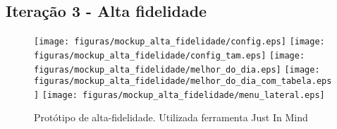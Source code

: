 	\subsection{Iteração 3 - Alta fidelidade}

		\begin{figure}[h]
			\centering
				\texttt{[image: figuras/mockup\_alta\_fidelidade/config.eps]}
				\texttt{[image: figuras/mockup\_alta\_fidelidade/config\_tam.eps]}
				\texttt{[image: figuras/mockup\_alta\_fidelidade/melhor\_do\_dia.eps]}
				\texttt{[image: figuras/mockup\_alta\_fidelidade/melhor\_do\_dia\_com\_tabela.eps]}
				\texttt{[image: figuras/mockup\_alta\_fidelidade/menu\_lateral.eps]}
			\caption{Protótipo de alta-fidelidade. Utilizada ferramenta Just In Mind}
			\label{fig:mockup_alta_fidelidade}
		\end{figure}

